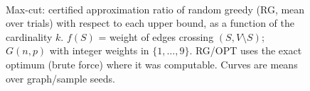 \begin{figure}[t]
\centering
\setlength{\rgplotwidth}{0.49\columnwidth}
\\[1pt]

\caption{Max-cut: certified approximation ratio of random greedy (RG, mean over trials) with respect to each upper bound, as a function of the cardinality $k$. $f(S)$ = weight of edges crossing $(S, V\setminus S)$; $G(n,p)$ with integer weights in $\{1,\dots,9\}$. RG/OPT uses the exact optimum (brute force) where it was computable. Curves are means over graph/sample seeds.}
\label{fig:rg-max_cut}
\end{figure}
